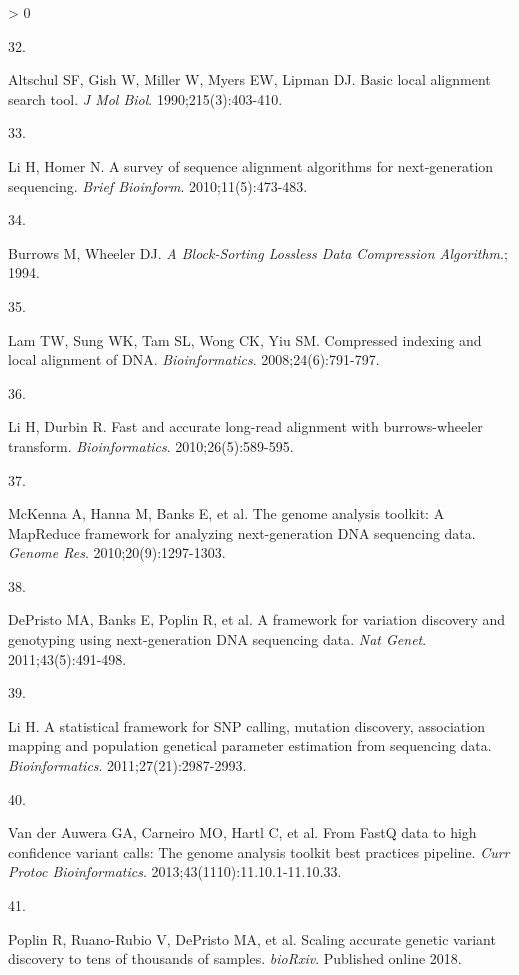 \documentclass[11pt,letterpaper,oneside]{book}
\newlength{\cslhangindent}
\newlength{\csllabelwidth}
\newenvironment{CSLReferences}[3] %
 {%
  \setlength{\parindent}{0pt}
  \ifodd #1 \everypar{\setlength{\hangindent}{\cslhangindent}}\ignorespaces\fi
  \ifnum #2 > 0
  \setlength{\parskip}{#2\baselineskip}
  \fi
 }%
 {}
\newcommand{\CSLLeftMargin}[1]{\parbox[t]{\maxof{\widthof{#1}}{\csllabelwidth}}{#1}}
\newcommand{\CSLRightInline}[1]{\parbox[t]{\linewidth-\csllabelwidth}{#1}\newline}
\begin{document}
\begin{CSLReferences}{0}{0}
\leavevmode\hypertarget{ref-altschul:1990aa}{}%
\CSLLeftMargin{32. }
\CSLRightInline{Altschul SF, Gish W, Miller W, Myers EW, Lipman DJ. Basic local alignment search tool. \emph{J Mol Biol}. 1990;215(3):403-410.}

\leavevmode\hypertarget{ref-li:2010aa}{}%
\CSLLeftMargin{33. }
\CSLRightInline{Li H, Homer N. A survey of sequence alignment algorithms for next-generation sequencing. \emph{Brief Bioinform}. 2010;11(5):473-483.}

\leavevmode\hypertarget{ref-burrows:1994aa}{}%
\CSLLeftMargin{34. }
\CSLRightInline{Burrows M, Wheeler DJ. \emph{A Block-Sorting Lossless Data Compression Algorithm}.; 1994.}

\leavevmode\hypertarget{ref-lam:2008aa}{}%
\CSLLeftMargin{35. }
\CSLRightInline{Lam TW, Sung WK, Tam SL, Wong CK, Yiu SM. Compressed indexing and local alignment of DNA. \emph{Bioinformatics}. 2008;24(6):791-797.}

\leavevmode\hypertarget{ref-li:2010ab}{}%
\CSLLeftMargin{36. }
\CSLRightInline{Li H, Durbin R. Fast and accurate long-read alignment with burrows-wheeler transform. \emph{Bioinformatics}. 2010;26(5):589-595.}

\leavevmode\hypertarget{ref-mckenna:2010aa}{}%
\CSLLeftMargin{37. }
\CSLRightInline{McKenna A, Hanna M, Banks E, et al. The genome analysis toolkit: A MapReduce framework for analyzing next-generation DNA sequencing data. \emph{Genome Res}. 2010;20(9):1297-1303.}

\leavevmode\hypertarget{ref-depristo:2011aa}{}%
\CSLLeftMargin{38. }
\CSLRightInline{DePristo MA, Banks E, Poplin R, et al. A framework for variation discovery and genotyping using next-generation DNA sequencing data. \emph{Nat Genet}. 2011;43(5):491-498.}

\leavevmode\hypertarget{ref-li:2011aa}{}%
\CSLLeftMargin{39. }
\CSLRightInline{Li H. A statistical framework for SNP calling, mutation discovery, association mapping and population genetical parameter estimation from sequencing data. \emph{Bioinformatics}. 2011;27(21):2987-2993.}

\leavevmode\hypertarget{ref-van-der-auwera:2013aa}{}%
\CSLLeftMargin{40. }
\CSLRightInline{Van der Auwera GA, Carneiro MO, Hartl C, et al. From FastQ data to high confidence variant calls: The genome analysis toolkit best practices pipeline. \emph{Curr Protoc Bioinformatics}. 2013;43(1110):11.10.1-11.10.33.}

\leavevmode\hypertarget{ref-poplin:2018aa}{}%
\CSLLeftMargin{41. }
\CSLRightInline{Poplin R, Ruano-Rubio V, DePristo MA, et al. Scaling accurate genetic variant discovery to tens of thousands of samples. \emph{bioRxiv}. Published online 2018.}


\end{CSLReferences}
\end{document}
